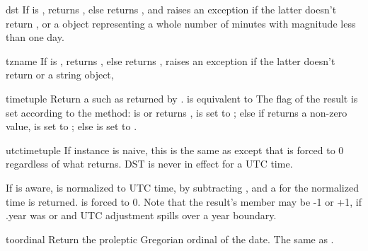 \begin{methoddesc}{dst}{}
  If  is , returns , else
  returns , and
  raises an exception if the latter doesn't return , or
  a  object representing a whole number of minutes
  with magnitude less than one day.
\end{methoddesc}

\begin{methoddesc}{tzname}{}
  If  is , returns , else
  returns ,
  raises an exception if the latter doesn't return  or
  a string object,
\end{methoddesc}

\begin{methoddesc}{timetuple}{}
  Return a  such as returned by
  .
   is equivalent to
  The  flag of the result is set according to
  the  method:   is  or
   returns ,
   is set to  ; else if  returns
  a non-zero value,  is set to ;
  else  is set to .
\end{methoddesc}

\begin{methoddesc}{utctimetuple}{}
  If  instance  is naive, this is the same as
   except that  is forced to 0
  regardless of what  returns.  DST is never in effect
  for a UTC time.

  If  is aware,  is normalized to UTC time, by subtracting
  , and a  for the
  normalized time is returned.   is forced to 0.
  Note that the result's  member may be
  -1 or +1, if .year was
   or  and UTC adjustment spills over a
  year boundary.
\end{methoddesc}

\begin{methoddesc}{toordinal}{}
  Return the proleptic Gregorian ordinal of the date.  The same as
  .
\end{methoddesc}

